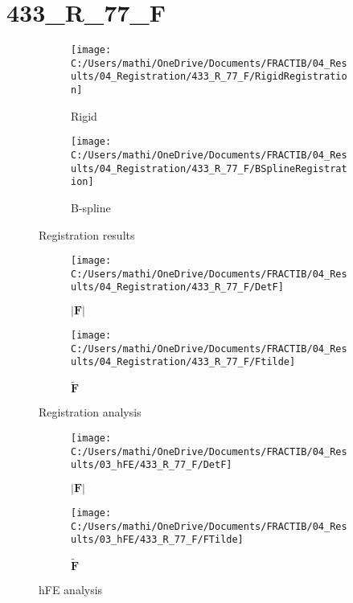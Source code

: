 \documentclass{article}%
\begin{document}
%
\newpage%
\section*{433\_R\_77\_F}%
\label{sec:433R77F}%


\begin{figure}[h!]%
\begin{subfigure}[b]{0.5\linewidth}%
\texttt{[image: C:/Users/mathi/OneDrive/Documents/FRACTIB/04\_Results/04\_Registration/433\_R\_77\_F/RigidRegistration]}%
\caption{Rigid}%
\end{subfigure}%
\begin{subfigure}[b]{0.5\linewidth}%
\texttt{[image: C:/Users/mathi/OneDrive/Documents/FRACTIB/04\_Results/04\_Registration/433\_R\_77\_F/BSplineRegistration]}%
\caption{B{-}spline}%
\end{subfigure}%
\caption{Registration results}%
\end{figure}

%


\begin{figure}[h!]%
\begin{subfigure}[b]{0.5\linewidth}%
\texttt{[image: C:/Users/mathi/OneDrive/Documents/FRACTIB/04\_Results/04\_Registration/433\_R\_77\_F/DetF]}%
\caption{$|\mathbf{F}|$}%
\end{subfigure}%
\begin{subfigure}[b]{0.5\linewidth}%
\texttt{[image: C:/Users/mathi/OneDrive/Documents/FRACTIB/04\_Results/04\_Registration/433\_R\_77\_F/Ftilde]}%
\caption{$\tilde{\mathbf{F}}$}%
\end{subfigure}%
\caption{Registration analysis}%
\end{figure}

%


\begin{figure}[h!]%
\begin{subfigure}[b]{0.5\linewidth}%
\texttt{[image: C:/Users/mathi/OneDrive/Documents/FRACTIB/04\_Results/03\_hFE/433\_R\_77\_F/DetF]}%
\caption{$|\mathbf{F}|$}%
\end{subfigure}%
\begin{subfigure}[b]{0.5\linewidth}%
\texttt{[image: C:/Users/mathi/OneDrive/Documents/FRACTIB/04\_Results/03\_hFE/433\_R\_77\_F/FTilde]}%
\caption{$\tilde{\mathbf{F}}$}%
\end{subfigure}%
\caption{hFE analysis}%
\end{figure}
\end{document}
